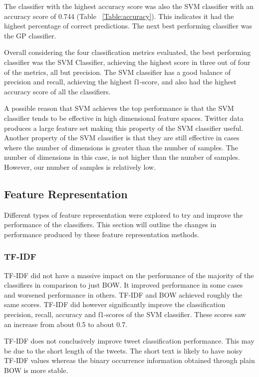 The classifier with the highest accuracy score was also the SVM classifier with an accuracy score of 0.744 (Table ~\ref{Table:accuracy}). This indicates it had the highest percentage of correct predictions. The next best performing classifier was the GP classifier.

Overall considering the four classification metrics evaluated, the best performing classifier was the SVM Classifier, achieving the highest score in three out of four of the metrics, all but precision. The SVM classifier has a good balance of precision and recall, achieving the highest f1-score, and also had the highest accuracy score of all the classifiers.

A possible reason that SVM achieves the top performance is that the SVM classifier tends to be effective in high dimensional feature spaces. Twitter data produces a large feature set making this property of the SVM classifier useful. Another property of the SVM classifier is that they are still effective in cases where the number of dimensions is greater than the number of samples. The number of dimensions in this case, is not higher than the number of samples. However, our number of samples is relatively low.

\subsection{Feature Representation}

Different types of feature representation were explored to try and improve the performance of the classifiers. This section will outline the changes in performance produced by these feature representation methods. 

\subsubsection*{TF-IDF}
TF-IDF did not have a massive impact on the performance of the majority of the classifiers in comparison to just BOW. It improved performance in some cases and worsened performance in others. TF-IDF and BOW achieved roughly the same scores. TF-IDF did however significantly improve the classification precision, recall, accuracy and f1-scores of the SVM classifier. These scores saw an increase from about 0.5 to about 0.7.

TF-IDF does not conclusively improve tweet classification performance. This may be due to the short length of the tweets. The short text is likely to have noisy TF-IDF values whereas the binary occurrence information obtained through plain BOW is more stable.

